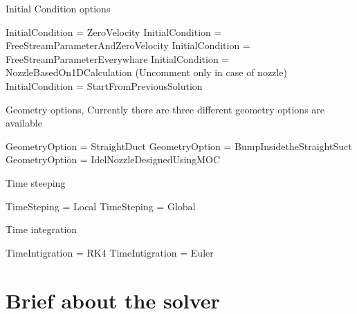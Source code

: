 \begin{DoxyEnumerate}
\item Initial Condition options \begin{DoxyVerb} InitialCondition = ZeroVelocity
 InitialCondition = FreeStreamParameterAndZeroVelocity
 InitialCondition = FreeStreamParameterEverywhare
 InitialCondition = NozzleBasedOn1DCalculation
 (Uncomment only in case of nozzle)
 InitialCondition = StartFromPreviousSolution
\end{DoxyVerb}

\item Geometry options, Currently there are three different geometry options are available \begin{DoxyVerb}GeometryOption = StraightDuct
GeometryOption = BumpInsidetheStraightSuct
GeometryOption = IdelNozzleDesignedUsingMOC
\end{DoxyVerb}

\item Time steeping \begin{DoxyVerb}TimeSteping = Local
TimeSteping = Global
\end{DoxyVerb}

\item Time integration \begin{DoxyVerb}TimeIntigration = RK4
TimeIntigration = Euler 
\end{DoxyVerb}

\end{DoxyEnumerate}\hypertarget{index_brief}{}\section{Brief about the solver}\label{index_brief}

